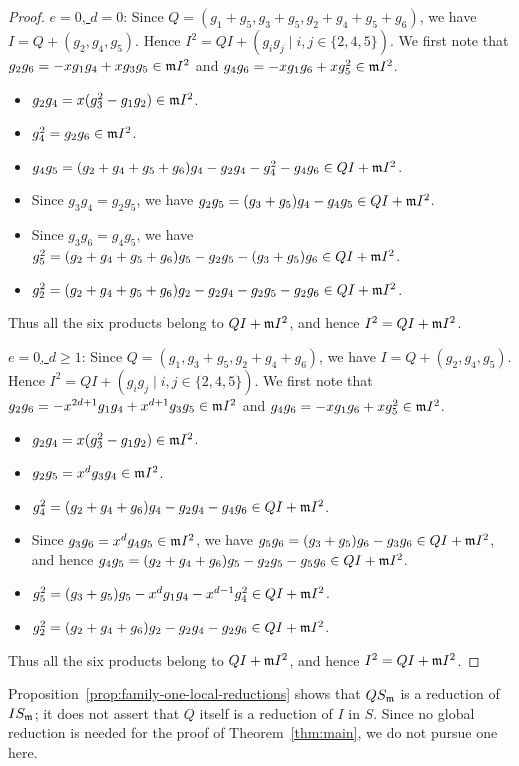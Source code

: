 \begin{proof}
	\noindent
	\underline{$e=0$, $d=0$}: Since
	$Q=(g_1+g_5,g_3+g_5,g_2+g_4+g_5+g_6)$, we have
	$I=Q+(g_2,g_4,g_5)$.
	Hence $I^2=QI+(g_ig_j\mid i,j\in\{2,4,5\})$.
	We first note that
	$g_2g_6=-xg_1g_4+xg_3g_5\in\mathfrak m I^2$ and
	$g_4g_6=-xg_1g_6+xg_5^2\in\mathfrak m I^2$.
	\begin{itemize}
		\item $g_2g_4=x(g_3^2-g_1g_2)\in\mathfrak m I^2$.
		\item $g_4^2=g_2g_6\in\mathfrak m I^2$.
		\item $g_4g_5=(g_2+g_4+g_5+g_6)g_4-g_2g_4-g_4^2-g_4g_6\in QI+\mathfrak m I^2$.
		\item Since $g_3g_4=g_2g_5$, we have
		$g_2g_5=(g_3+g_5)g_4-g_4g_5\in QI+\mathfrak m I^2$.
		\item Since $g_3g_6=g_4g_5$, we have
		$g_5^2=(g_2+g_4+g_5+g_6)g_5-g_2g_5-(g_3+g_5)g_6\in QI+\mathfrak m I^2$.
		\item $g_2^2=(g_2+g_4+g_5+g_6)g_2-g_2g_4-g_2g_5-g_2g_6\in QI+\mathfrak m I^2$.
	\end{itemize}
	Thus all the six products belong to $QI+\mathfrak m I^2$, and hence
	$I^2=QI+\mathfrak m I^2$.

	\medskip
	
	\noindent
	\underline{$e=0$, $d\geq1$}: Since $Q=(g_1,g_3+g_5,g_2+g_4+g_6)$, we have
	$I=Q+(g_2,g_4,g_5)$.
	Hence $I^2=QI+(g_ig_j\mid i,j\in\{2,4,5\})$.
	We first note that
	$g_2g_6=-x^{2d+1}g_1g_4+x^{d+1}g_3g_5\in\mathfrak m I^2$ and
	$g_4g_6=-xg_1g_6+xg_5^2\in\mathfrak m I^2$.
	\begin{itemize}
		\item $g_2g_4=x(g_3^2-g_1g_2)\in\mathfrak m I^2$.
		\item $g_2g_5=x^dg_3g_4\in\mathfrak m I^2$.
		\item $g_4^2=(g_2+g_4+g_6)g_4-g_2g_4-g_4g_6\in QI+\mathfrak m I^2$.
		\item Since $g_3g_6=x^dg_4g_5\in\mathfrak m I^2$, we have
		$g_5g_6=(g_3+g_5)g_6-g_3g_6\in QI+\mathfrak m I^2$, and hence
		$g_4g_5=(g_2+g_4+g_6)g_5-g_2g_5-g_5g_6\in QI+\mathfrak m I^2$.
		\item $g_5^2=(g_3+g_5)g_5-x^dg_1g_4-x^{d-1}g_4^2\in QI+\mathfrak m I^2$.
		\item $g_2^2=(g_2+g_4+g_6)g_2-g_2g_4-g_2g_6\in QI+\mathfrak m I^2$.
	\end{itemize}
	Thus all the six products belong to $QI+\mathfrak m I^2$, and hence
	$I^2=QI+\mathfrak m I^2$.
\end{proof}

\begin{remark}
Proposition~\ref{prop:family-one-local-reductions} shows that $QS_\mathfrak m$ is a
reduction of $IS_\mathfrak m$; it does not assert that $Q$ itself is a reduction of
$I$ in $S$.  Since no global reduction is needed for the proof of
Theorem~\ref{thm:main}, we do not pursue one here.
\end{remark}

